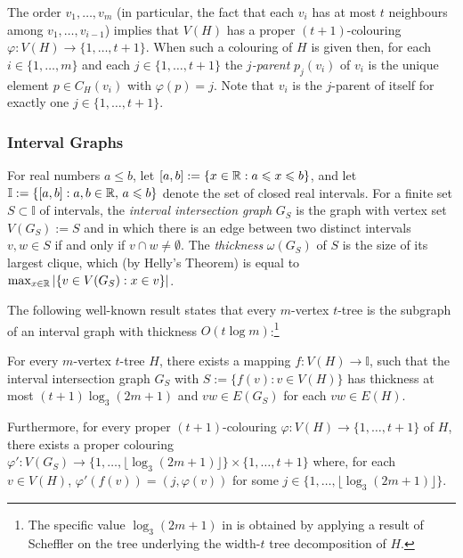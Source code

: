 \documentclass[kpfonts]{patmorin}
\let\le\leqslant
\begin{document}
The order $v_1,\ldots,v_m$ (in particular, the fact that each $v_i$ has at most $t$ neighbours among $v_1,\ldots,v_{i-1}$) implies that $V(H)$ has a proper $(t+1)$-colouring $\varphi:V(H)\to\{1,\ldots,t+1\}$.  When such a colouring of $H$ is given then, for each $i\in\{1,\ldots,m\}$ and each $j\in\{1,\ldots,t+1\}$ the \emph{$j$-parent} $p_j(v_i)$ of $v_i$ is the unique element $p\in C_H(v_i)$ with $\varphi(p)=j$.  Note that $v_i$ is the $j$-parent of itself for exactly one $j\in\{1,\ldots,t+1\}$.

\subsubsection{Interval Graphs}

For real numbers $a\le b$, let $[a,b]:=\{ x\in\R: a\le x\le b\}$, and let
$\mathbb{I}:=\{[a,b]: a,b\in\R,\, a\le b\}$ denote the set of closed real intervals.  For a finite set $S\subset\mathbb{I}$ of intervals, the \emph{interval intersection graph} $G_S$ is the graph with vertex set $V(G_S):=S$ and in which there is an edge between two distinct intervals $v, w\in S$ if and only if $v\cap w\neq \emptyset$.  The \emph{thickness} $\omega(G_S)$ of $S$ is the size of its largest clique, which (by Helly's Theorem) is equal to $\max_{x\in\mathbb{R}}|\{v\in V(G_S):x\in v\}|$.


The following well-known result states that every $m$-vertex $t$-tree is the subgraph of an interval graph with thickness $O(t\log m)$:\footnote{The specific value $\log_3 (2m+1)$ in  is obtained by applying a result of Scheffler \cite{scheffler:optimal} on the tree underlying the width-$t$ tree decomposition of $H$.}

\begin{lem}
  For every $m$-vertex $t$-tree $H$, there exists a mapping $f:V(H)\to\mathbb{I}$, such that the interval intersection graph $G_S$ with $S:=\{f(v):v\in V(H)\}$ has thickness at most $(t+1)\log_3(2m+1)$ and
  $vw\in E(G_S)$ for each $vw\in E(H)$. %

  Furthermore, for every proper $(t+1)$-colouring $\varphi:V(H)\to\{1,\ldots,t+1\}$ of $H$, there exists a proper colouring $\varphi':V(G_S)\to\{1,\ldots,\lfloor\log_3(2m+1)\rfloor\}\times\{1,\ldots,t+1\}$ where, for each $v\in V(H)$, $\varphi'(f(v))=(j,\varphi(v))$ for some $j\in\{1,\ldots,\lfloor\log_3(2m+1)\rfloor\}$.
\end{lem}
\end{document}
